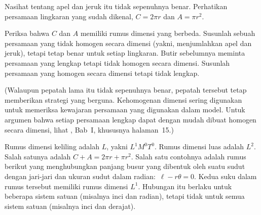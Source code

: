 \begin{exercises}
  \item \label{exer:AppsAndOranges}
    Nasihat tentang apel dan jeruk itu tidak sepenuhnya benar.
    Perhatikan persamaan lingkaran yang sudah dikenal, $C=2\pi r$ dan $A=\pi r^2$.
    \begin{exparts}
      \partsitem Periksa bahwa $C$ dan $A$ memiliki rumus dimensi yang berbeda.
      \partsitem Susunlah sebuah persamaan yang tidak
        homogen secara dimensi (yakni,
        menjumlahkan apel dan jeruk), tetapi tetap benar untuk setiap lingkaran.
      \partsitem Butir sebelumnya meminta persamaan yang lengkap tetapi
        tidak homogen secara dimensi.
        Susunlah persamaan yang homogen secara dimensi tetapi tidak lengkap.
    \end{exparts}
    (Walaupun pepatah lama itu tidak sepenuhnya benar, pepatah tersebut tetap
    memberikan strategi yang berguna.
    Kehomogenan dimensi sering digunakan untuk memeriksa kewajaran
    persamaan yang digunakan dalam model.
    Untuk argumen bahwa setiap persamaan lengkap dapat dengan mudah dibuat
    homogen secara dimensi, lihat \cite{Bridgman}, Bab~I,
    khususnya halaman~15.)
    \begin{answer}
      \begin{exparts}
        \partsitem Rumus dimensi keliling adalah $L$,
          yakni $L^1M^0T^0$.
          Rumus dimensi luas adalah $L^2$.
        \partsitem Salah satunya adalah $C+A=2\pi r + \pi r^2$.
        \partsitem Salah satu contohnya adalah rumus berikut yang menghubungkan
           panjang busur yang dibentuk oleh suatu sudut dengan jari-jari dan
           ukuran sudut dalam radian:~$\ell-r\theta=0$.
           Kedua suku dalam rumus tersebut memiliki
           rumus dimensi $L^1$.
           Hubungan itu berlaku untuk beberapa
           sistem satuan (misalnya inci dan radian), tetapi tidak untuk semua
           sistem satuan (misalnya inci dan derajat).
      \end{exparts}
    \end{answer}
\end{exercises}
\endinput
